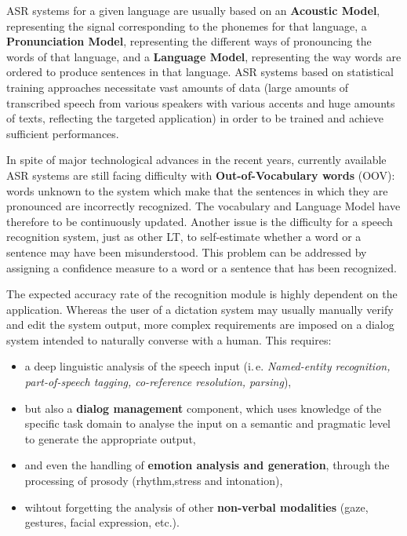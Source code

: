 \begin{multicols}{2}
ASR systems for a given language are usually based on an {\bf Acoustic
Model}, representing the signal corresponding to the phonemes for that
language, a {\bf Pronunciation Model}, representing the different ways of
pronouncing the words of that language, and a {\bf Language Model},
representing the way words are ordered to produce sentences in that
language. ASR systems based on statistical training approaches
necessitate vast amounts of data (large amounts of transcribed speech
from various speakers with various accents and huge amounts of texts,
reflecting the targeted application) in order to be trained and
achieve sufficient performances.

In spite of major technological advances in the recent years,
currently available ASR systems are still facing difficulty with
{\bf Out-of-Vocabulary words} (OOV): words unknown to the system which make
that the sentences in which they are pronounced are incorrectly
recognized. The vocabulary and Language Model have therefore to be
continuously updated. Another issue is the difficulty for a speech
recognition system, just as other LT, to self-estimate whether a word
or a sentence may have been misunderstood. This problem can be
addressed by assigning a confidence measure to a word or a sentence
that has been recognized.

The expected accuracy rate of the recognition module is highly
dependent on the application. Whereas the user of a dictation system
may usually manually verify and edit the system output, more complex
requirements are imposed on a dialog system intended to naturally
converse with a human. This requires:

\begin{itemize} 
\item a deep linguistic analysis of the speech input (i.\,e. {\em
  Named-entity recognition, part-of-speech tagging, co-reference
  resolution, parsing}),
\item but also a {\bf dialog management} component, which uses
  knowledge of the specific task domain to analyse the input on a
  semantic and pragmatic level to generate the appropriate output,
\item and even the handling of {\bf emotion analysis and generation},
  through the processing of prosody (rhythm,stress and intonation),
\item wihtout forgetting the analysis of other {\bf non-verbal
  modalities} (gaze, gestures, facial expression, etc.).
\end{itemize}


\end{multicols}
